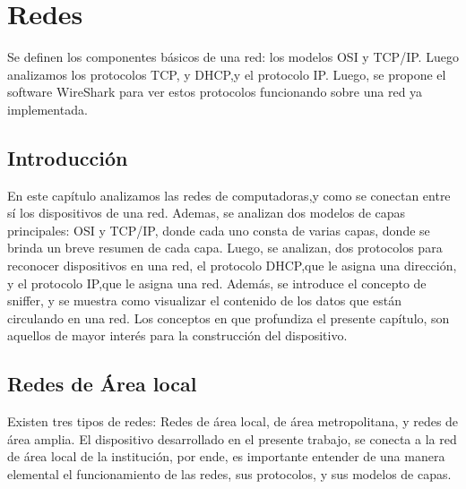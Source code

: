 \renewcommand{\chaptername}{Redes}  
\graphicspath{{parte_2/redes/}}
\chapter{Redes}
\markright{\chaptername }

\begin{center}
	\begin{tcolorbox}[colback=gray!5!white, %
		colframe=blue!75!black,
		title= \center{\Large{resumen}} ]
		Se definen los componentes básicos de una red: los modelos OSI y TCP/IP. Luego analizamos los protocolos TCP, y DHCP,y el protocolo IP. Luego, se propone el software WireShark para ver estos protocolos funcionando sobre una red ya implementada. 

	\end{tcolorbox}
\end{center}    
\section{Introducción} 
En este capítulo analizamos las redes de computadoras,y como se conectan entre sí los dispositivos de una red. Ademas, se analizan dos modelos de capas principales: OSI y TCP/IP, donde cada uno consta de varias capas, donde se brinda un breve resumen de cada capa. 
Luego, se analizan, dos protocolos para reconocer dispositivos en una red, el protocolo DHCP,que le asigna una dirección, y el protocolo IP,que le asigna una red. Además, se introduce el concepto de sniffer, y se muestra como visualizar el contenido de los datos que están circulando en una red. Los conceptos en que profundiza el presente capítulo, son aquellos de mayor interés para la construcción del dispositivo.  


\section{Redes de Área local }
Existen tres tipos de redes: Redes de área local, de área metropolitana, y redes de área amplia. El dispositivo desarrollado en el presente trabajo, se conecta a la red de área local de la institución, por ende, es importante entender de una manera elemental el funcionamiento de las redes, sus protocolos, y sus modelos de capas.   

